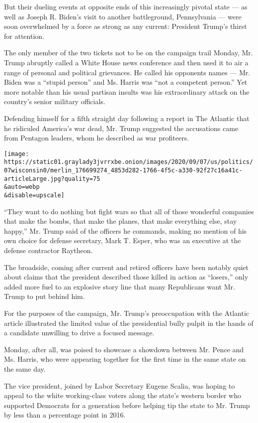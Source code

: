 But their dueling events at opposite ends of this increasingly pivotal
state --- as well as Joseph R. Biden's visit to another battleground,
Pennsylvania --- were soon overwhelmed by a force as strong as any
current: President Trump's thirst for attention. ​

The only member of the two tickets not to be on the campaign trail
Monday, Mr. Trump abruptly called a White House news conference and then
used it to air a range of personal and political grievances. He called
his opponents names --- Mr. Biden was a ``stupid person'' and Ms. Harris
was ``not a competent person.'' Yet more notable than his usual partisan
insults was his extraordinary attack on the country's senior military
officials.

Defending himself for a fifth straight day following a report in The
Atlantic that he ridiculed America's war dead, Mr. Trump suggested the
accusations came from Pentagon leaders, whom he described as war
profiteers.

\texttt{[image: https://static01.graylady3jvrrxbe.onion/images/2020/09/07/us/politics/07wisconsin0/merlin\_176699274\_4853d282-1766-4f5c-a330-92f27c16a41c-articleLarge.jpg?quality=75\\\&auto=webp\\\&disable=upscale]}

``They want to do nothing but fight wars so that all of those wonderful
companies that make the bombs, that make the planes, that make
everything else, stay happy,'' Mr. Trump said of the officers he
commands, making no mention of his own choice for defense secretary,
Mark T. Esper, who was an executive at the defense contractor Raytheon.

The broadside, coming after current and retired officers have been
notably quiet about claims that the president described those killed in
action as ``losers,'' only added more fuel to an explosive story line
that many Republicans want Mr. Trump to put behind him.

For the purposes of the campaign, Mr. Trump's preoccupation with the
Atlantic article illustrated the limited value of the presidential bully
pulpit in the hands of a candidate unwilling to drive a focused message.

Monday, after all, was poised to showcase a showdown between Mr. Pence
and Ms. Harris, who were appearing together for the first time in the
same state on the same day.

The vice president, joined by Labor Secretary Eugene Scalia, was hoping
to appeal to the white working-class voters along the state's western
border who supported Democrats for a generation before helping tip the
state to Mr. Trump by less than a percentage point in 2016.

